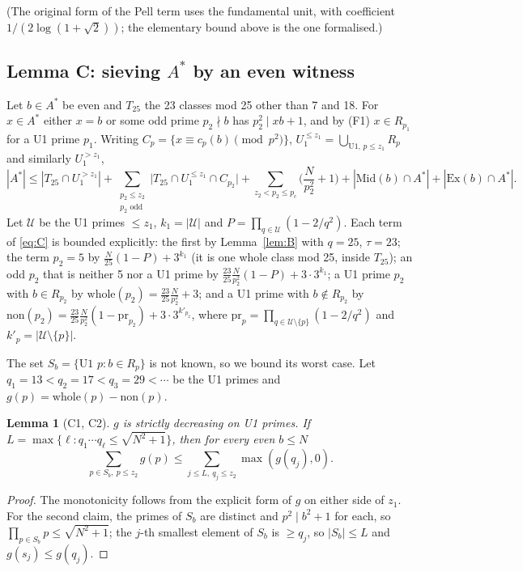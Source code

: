 \documentclass[11pt]{amsart}
\newtheorem{lemma}[theorem]{Lemma}
\theoremstyle{definition}
\theoremstyle{remark}
\newcommand{\Mid}{\mathrm{Mid}}
\newcommand{\Ex}{\mathrm{Ex}}
\begin{document}
(The original form of the Pell term uses the fundamental unit, with coefficient
$1/(2\log(1+\sqrt2))$; the elementary bound above is the one formalised.)

\subsection{Lemma C: sieving $A^*$ by an even witness}
Let $b\in A^*$ be even and $T_{25}$ the 23 classes mod 25 other than 7 and 18. For
$x\in A^*$ either $x=b$ or some odd prime $p_2\nmid b$ has $p_2^2\mid xb+1$, and by
(F1) $x\in R_{p_1}$ for a U1 prime $p_1$. Writing $C_p=\{x\equiv c_p(b)\pmod{p^2}\}$,
$U_1^{\le z_1}=\bigcup_{\text{U1},\,p\le z_1}R_p$ and similarly $U_1^{>z_1}$,
\begin{equation}\label{eq:C}
|A^*|\le|T_{25}\cap U_1^{>z_1}|+\sum_{\substack{p_2\le z_2\\ p_2\text{ odd}}}
\big|T_{25}\cap U_1^{\le z_1}\cap C_{p_2}\big|
+\sum_{z_2<p_2\le p_c}\Big(\frac N{p_2^2}+1\Big)+|\Mid(b)\cap A^*|+|\Ex(b)\cap A^*|.
\end{equation}
Let $\mathcal U$ be the U1 primes $\le z_1$, $k_1=|\mathcal U|$ and
$P=\prod_{q\in\mathcal U}(1-2/q^2)$. Each term of \eqref{eq:C} is bounded
explicitly: the first by Lemma~\ref{lem:B} with $q=25$, $\tau=23$; the term
$p_2=5$ by $\frac N{25}(1-P)+3^{k_1}$ (it is one whole class mod 25, inside
$T_{25}$); an odd $p_2$ that is neither 5 nor a U1 prime by
$\frac{23}{25}\frac N{p_2^2}(1-P)+3\cdot3^{k_1}$; a U1 prime $p_2$ with
$b\in R_{p_2}$ by $\mathrm{whole}(p_2)=\frac{23}{25}\frac N{p_2^2}+3$; and a U1
prime with $b\notin R_{p_2}$ by
$\mathrm{non}(p_2)=\frac{23}{25}\frac N{p_2^2}(1-\mathrm{pr}_{p_2})+3\cdot3^{k'_{p_2}}$,
where $\mathrm{pr}_p=\prod_{q\in\mathcal U\setminus\{p\}}(1-2/q^2)$ and
$k'_p=|\mathcal U\setminus\{p\}|$.

The set $S_b=\{\text{U1 }p: b\in R_p\}$ is not known, so we bound its worst case.
Let $q_1=13<q_2=17<q_3=29<\cdots$ be the U1 primes and $g(p)=\mathrm{whole}(p)-\mathrm{non}(p)$.

\begin{lemma}[C1, C2]
$g$ is strictly decreasing on U1 primes. If
$L=\max\{\ell: q_1\cdots q_\ell\le\sqrt{N^2+1}\}$, then for every even $b\le N$
\[
\sum_{p\in S_b,\ p\le z_2}g(p)\le\sum_{j\le L,\ q_j\le z_2}\max(g(q_j),0).
\]
\end{lemma}

\begin{proof}
The monotonicity follows from the explicit form of $g$ on either side of $z_1$.
For the second claim, the primes of $S_b$ are distinct and $p^2\mid b^2+1$ for each,
so $\prod_{p\in S_b}p\le\sqrt{N^2+1}$; the $j$-th smallest element of $S_b$ is
$\ge q_j$, so $|S_b|\le L$ and $g(s_j)\le g(q_j)$.
\end{proof}
\end{document}
